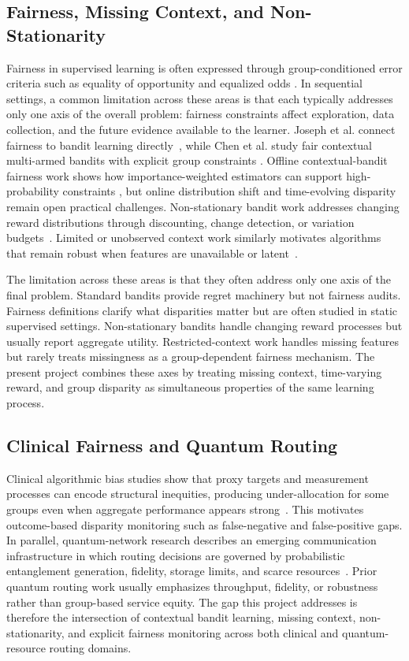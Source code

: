 \documentclass[conference]{IEEEtran}
\begin{document}
\subsection{Fairness, Missing Context, and Non-Stationarity}
Fairness in supervised learning is often expressed through group-conditioned
error criteria such as equality of opportunity and equalized odds
\cite{hardt2016equality}. In sequential settings, a common limitation across
these areas is that each typically addresses only one axis of the overall
problem: fairness constraints affect exploration, data collection, and the
future evidence available to the learner. Joseph et al. connect fairness to
bandit learning directly~\cite{joseph2016fairness}, while Chen et al. study
fair contextual multi-armed bandits with explicit group constraints
\cite{chen2020fair}. Offline contextual-bandit fairness work shows how
importance-weighted estimators can support high-probability constraints
\cite{metevier2019offline}, but online distribution shift and time-evolving
disparity remain open practical challenges. Non-stationary bandit work
addresses changing reward distributions through discounting, change detection,
or variation budgets~\cite{garivier2008ucb,besbes2014stochastic}. Limited or
unobserved context work similarly motivates algorithms that remain robust when
features are unavailable or latent~\cite{bouneffouf2017context,park2022efficient}.

The limitation across these areas is that they often address only one axis of
the final problem. Standard bandits provide regret machinery but not fairness
audits. Fairness definitions clarify what disparities matter but are often
studied in static supervised settings. Non-stationary bandits handle changing
reward processes but usually report aggregate utility. Restricted-context work
handles missing features but rarely treats missingness as a group-dependent
fairness mechanism. The present project combines these axes by treating
missing context, time-varying reward, and group disparity as simultaneous
properties of the same learning process.

\subsection{Clinical Fairness and Quantum Routing}
Clinical algorithmic bias studies show that proxy targets and measurement
processes can encode structural inequities, producing under-allocation for
some groups even when aggregate performance appears strong~\cite{obermeyer2019dissecting}.
This motivates outcome-based disparity monitoring such as false-negative and
false-positive gaps. In parallel, quantum-network research describes an
emerging communication infrastructure in which routing decisions are governed
by probabilistic entanglement generation, fidelity, storage limits, and
scarce resources~\cite{wehner2018quantum,pant2019routing,caleffi2017optimal}.
Prior quantum routing work usually emphasizes throughput, fidelity, or
robustness rather than group-based service equity. The gap this project
addresses is therefore the intersection of contextual bandit learning,
missing context, non-stationarity, and explicit fairness monitoring across
both clinical and quantum-resource routing domains.
\end{document}

